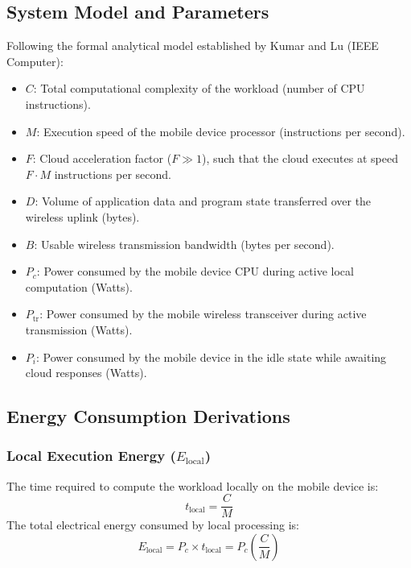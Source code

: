 \documentclass[11pt,a4paper,openany]{report}
\begin{document}
\subsection{System Model and Parameters}
Following the formal analytical model established by Kumar and Lu (IEEE Computer):
\begin{itemize}[leftmargin=*]
  \item $C$: Total computational complexity of the workload (number of CPU instructions).
  \item $M$: Execution speed of the mobile device processor (instructions per second).
  \item $F$: Cloud acceleration factor ($F \gg 1$), such that the cloud executes at speed $F \cdot M$ instructions per second.
  \item $D$: Volume of application data and program state transferred over the wireless uplink (bytes).
  \item $B$: Usable wireless transmission bandwidth (bytes per second).
  \item $P_c$: Power consumed by the mobile device CPU during active local computation (Watts).
  \item $P_{\text{tr}}$: Power consumed by the mobile wireless transceiver during active transmission (Watts).
  \item $P_i$: Power consumed by the mobile device in the idle state while awaiting cloud responses (Watts).
\end{itemize}

\subsection{Energy Consumption Derivations}
\subsubsection{Local Execution Energy ($E_{\text{local}}$)}
The time required to compute the workload locally on the mobile device is:
\begin{equation}
t_{\text{local}} = \frac{C}{M}
\end{equation}
The total electrical energy consumed by local processing is:
\begin{equation}
E_{\text{local}} = P_c \times t_{\text{local}} = P_c \left( \frac{C}{M} \right)
\end{equation}
\end{document}
